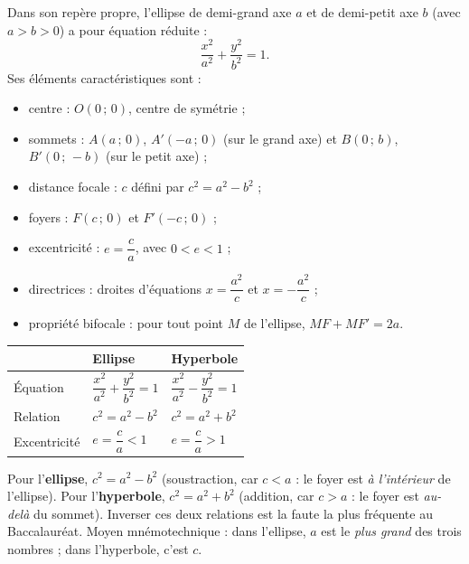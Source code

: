 \documentclass[11pt]{article}
\newcommand{\cle}[1]{{\popxbold\color{popdark}#1}}
\begin{document}
\begin{propriete}
Dans son repère propre, l'ellipse de \cle{demi-grand axe} $a$ et de \cle{demi-petit axe} $b$ (avec $a > b > 0$) a pour équation réduite :
\[ \frac{x^2}{a^2} + \frac{y^2}{b^2} = 1. \]
Ses éléments caractéristiques sont :
\begin{itemize}
\item \cle{centre} : $O(0\,;\,0)$, centre de symétrie ;
\item \cle{sommets} : $A(a\,;\,0)$, $A'(-a\,;\,0)$ (sur le grand axe) et $B(0\,;\,b)$, $B'(0\,;\,-b)$ (sur le petit axe) ;
\item \cle{distance focale} : $c$ défini par $c^2 = a^2 - b^2$ ;
\item \cle{foyers} : $F(c\,;\,0)$ et $F'(-c\,;\,0)$ ;
\item \cle{excentricité} : $e = \dfrac{c}{a}$, avec $0 < e < 1$ ;
\item \cle{directrices} : droites d'équations $x = \dfrac{a^2}{c}$ et $x = -\dfrac{a^2}{c}$ ;
\item \cle{propriété bifocale} : pour tout point $M$ de l'ellipse, $MF + MF' = 2a$.
\end{itemize}
\end{propriete}

\begin{aretenir}
\begin{center}
\begin{tabularx}{\linewidth}{|l|X|X|}
\hline
\rowcolor{popblueL} & \textbf{Ellipse} & \textbf{Hyperbole} \\
\hline
Équation & $\dfrac{x^2}{a^2} + \dfrac{y^2}{b^2} = 1$ & $\dfrac{x^2}{a^2} - \dfrac{y^2}{b^2} = 1$ \\
\hline
Relation & $c^2 = a^2 - b^2$ & $c^2 = a^2 + b^2$ \\
\hline
Excentricité & $e = \dfrac{c}{a} < 1$ & $e = \dfrac{c}{a} > 1$ \\
\hline
\end{tabularx}
\end{center}
\end{aretenir}

\begin{attention}
Pour l'\textbf{ellipse}, $c^2 = a^2 - b^2$ (soustraction, car $c < a$ : le foyer est \emph{à l'intérieur} de l'ellipse). Pour l'\textbf{hyperbole}, $c^2 = a^2 + b^2$ (addition, car $c > a$ : le foyer est \emph{au-delà} du sommet). Inverser ces deux relations est la faute la plus fréquente au Baccalauréat. Moyen mnémotechnique : dans l'ellipse, $a$ est le \emph{plus grand} des trois nombres ; dans l'hyperbole, c'est $c$.
\end{attention}
\end{document}
